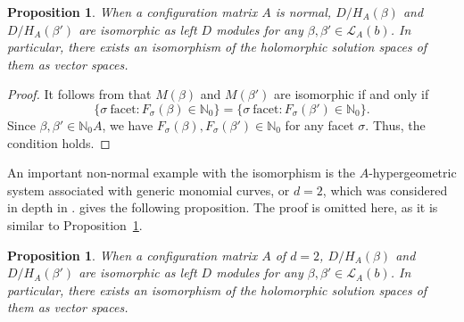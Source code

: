\documentclass[a4paper,12pt]{article}
\theoremstyle{plain}
\newtheorem{proposition}[theorem]{Proposition}
\theoremstyle{remark}
\begin{document}
\begin{proposition}\label{prop:iso1}
  When a configuration matrix $A$ is normal, $D/H_A(\beta)$ and
  $D/H_A(\beta')$ are isomorphic as left $D$ modules for any
  $\beta, \beta' \in \mathcal{L}_A(b)$. In particular, there
  exists an isomorphism of the holomorphic solution spaces of
  them as vector spaces. 
\end{proposition}

\begin{proof}
It follows from \cite[Theorem 5.2] {Saito01} that
$M(\beta)$ and $M(\beta')$ are isomorphic if and only if
\[
\{ \sigma \ \text{facet} : F_\sigma(\beta) \in \mathbb{N}_0 \}
= 
\{ \sigma \ \text{facet} : F_\sigma(\beta') \in \mathbb{N}_0 \}.
\]
Since $\beta, \beta'\in \mathbb{N}_0 A$, we have
$F_\sigma(\beta), F_\sigma(\beta') \in \mathbb{N}_0$ for any facet
$\sigma$. Thus, the condition holds.
\end{proof}

An important non-normal example with the isomorphism is
the $A$-hypergeometric system associated with generic monomial curves,
or $d=2$, which was considered in depth in \cite{Man17}.
\cite[Theorem 6.3] {Saito01} gives the following proposition.
The proof is omitted here, as it is similar to Proposition~\ref{prop:iso1}.

\begin{proposition}
  When a configuration matrix $A$ of $d=2$, $D/H_A(\beta)$ and
  $D/H_A(\beta')$ are isomorphic as left $D$ modules for any
  $\beta, \beta' \in \mathcal{L}_A(b)$. In particular, there
  exists an isomorphism of the holomorphic solution spaces of
  them as vector spaces. 
\end{proposition}
\end{document}
